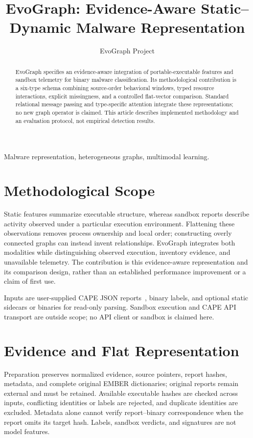 \documentclass[journal]{IEEEtran}
\title{EvoGraph: Evidence-Aware Static--Dynamic Malware Representation}
\author{EvoGraph Project}
\begin{document}
\maketitle

\begin{abstract}
EvoGraph specifies an evidence-aware integration of portable-executable
features and sandbox telemetry for binary malware classification. Its
methodological contribution is a six-type schema combining source-order
behavioral windows, typed resource interactions, explicit missingness, and
a controlled flat-vector comparison. Standard relational message passing
and type-specific attention integrate these representations; no new graph
operator is claimed. This article describes implemented methodology and
an evaluation protocol, not empirical detection results.
\end{abstract}

\begin{IEEEkeywords}
Malware representation, heterogeneous graphs, multimodal learning.
\end{IEEEkeywords}

\section{Methodological Scope}
Static features summarize executable structure, whereas sandbox reports
describe activity observed under a particular execution environment.
Flattening these observations removes process ownership and local order;
constructing overly connected graphs can instead invent relationships.
EvoGraph integrates both modalities while distinguishing observed
execution, inventory evidence, and unavailable telemetry. The contribution
is this evidence-aware representation and its comparison design, rather
than an established performance improvement or a claim of first use.

Inputs are user-supplied CAPE JSON reports~\cite{cape}, binary labels, and
optional static sidecars or binaries for read-only parsing. Sandbox
execution and CAPE API transport are outside scope; no API client or
sandbox is claimed here.

\section{Evidence and Flat Representation}
Preparation preserves normalized evidence, source pointers, report hashes,
metadata, and complete original EMBER dictionaries; original reports remain
external and must be retained. Available executable hashes are checked
across inputs, conflicting identities or labels are rejected, and duplicate
identities are excluded. Metadata alone cannot verify report--binary
correspondence when the report omits its target hash. Labels, sandbox
verdicts, and signatures are not model features.
\end{document}
